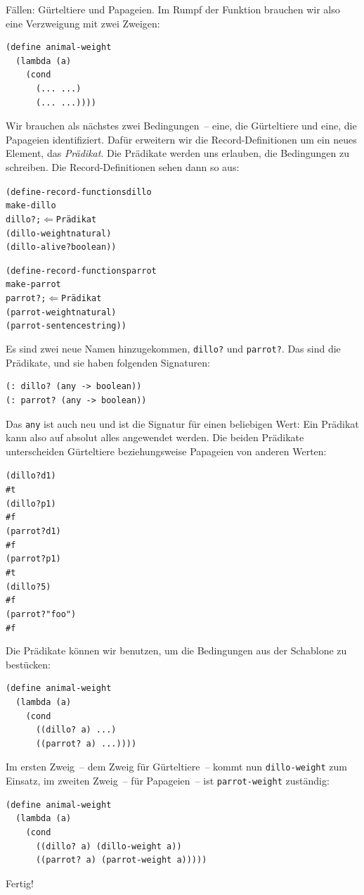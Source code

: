 Fällen: Gürteltiere und Papageien.  Im Rumpf der Funktion brauchen wir
also eine Verzweigung mit zwei Zweigen:
%
\begin{verbatim}
(define animal-weight
  (lambda (a)
    (cond
      (... ...)
      (... ...))))
\end{verbatim}
%
Wir brauchen als nächstes zwei Bedingungen~-- eine, die Gürteltiere
und eine, die Papageien identifiziert.  Dafür erweitern wir die
Record-Definitionen um ein neues Element, das \textit{Prädikat}.
Die Prädikate werden uns erlauben, die Bedingungen zu
schreiben.  Die Record-Definitionen sehen dann so aus:
%
\begin{alltt}
(define-record-functions dillo
  make-dillo
  dillo? ; \(\Longleftarrow\) Prädikat
  (dillo-weight natural)
  (dillo-alive? boolean))

(define-record-functions parrot
  make-parrot
  parrot? ; \(\Longleftarrow\) Prädikat
  (parrot-weight   natural)
  (parrot-sentence string))
\end{alltt}
%
Es sind zwei neue Namen hinzugekommen, \texttt{dillo?} und
\texttt{parrot?}. Das sind die Prädikate, und sie haben folgenden
Signaturen:
%
\begin{verbatim}
(: dillo? (any -> boolean))
(: parrot? (any -> boolean))
\end{verbatim}
%
Das \texttt{any} ist auch neu und ist die Signatur für einen
beliebigen Wert: Ein Prädikat kann also auf absolut alles angewendet
werden.  Die beiden Prädikate unterscheiden Gürteltiere
beziehungsweise Papageien von anderen Werten:
%
\begin{alltt}
(dillo? d1)
\evalsto #t
(dillo? p1)
\evalsto #f
(parrot? d1)
\evalsto #f
(parrot? p1)
\evalsto #t
(dillo? 5)
\evalsto #f
(parrot? "foo")
\evalsto #f
\end{alltt}
%
Die Prädikate können wir benutzen, um die Bedingungen aus der
Schablone zu bestücken:
%
\begin{verbatim}
(define animal-weight
  (lambda (a)
    (cond
      ((dillo? a) ...)
      ((parrot? a) ...))))
\end{verbatim}
%
Im ersten Zweig~-- dem Zweig für Gürteltiere~-- kommt nun
\texttt{dillo-weight} zum Einsatz, im zweiten Zweig~-- für
Papageien~-- ist \texttt{parrot-weight} zuständig:
%
\begin{verbatim}
(define animal-weight
  (lambda (a)
    (cond
      ((dillo? a) (dillo-weight a))
      ((parrot? a) (parrot-weight a)))))
\end{verbatim}
% 
Fertig!

